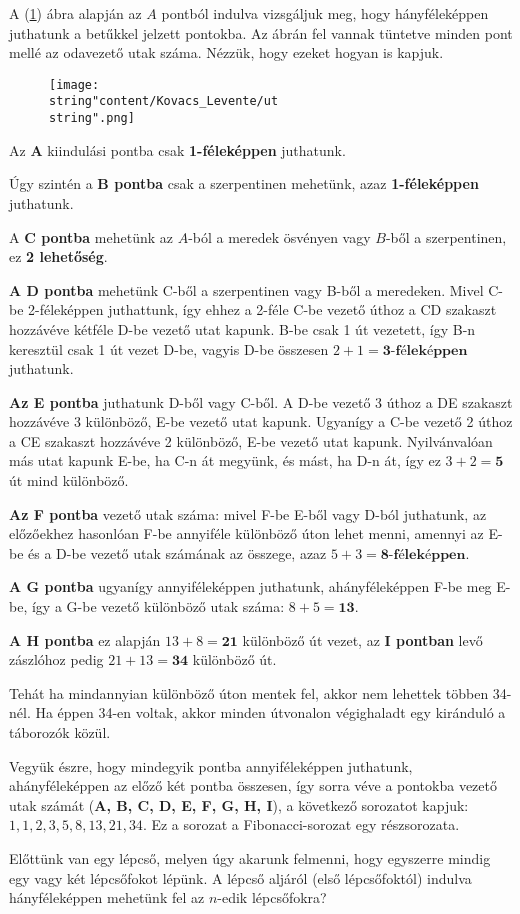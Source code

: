 \begin{solution}
A (\ref{fig3}) ábra alapján az $A$ pontból indulva vizsgáljuk meg,
hogy hányféleképpen juthatunk a betűkkel jelzett pontokba. Az ábrán
fel vannak tüntetve minden pont mellé az odavezető utak száma. Nézzük,
hogy ezeket hogyan is kapjuk.

\begin{figure}[h]
\centering \texttt{[image: \\string"content/Kovacs\_Levente/ut\\string".png]}
\caption{}
\label{fig3} 
\end{figure}

Az \textbf{A} kiindulási pontba csak \textbf{1-féleképpen} juthatunk.

Úgy szintén a \textbf{B pontba} csak a szerpentinen mehetünk, azaz
\textbf{1-féleképpen} juthatunk.

A \textbf{C pontba} mehetünk az $A$-ból a meredek ösvényen vagy $B$-ből
a szerpentinen, ez \textbf{2 lehetőség}.

\textbf{A D pontba} mehetünk C-ből a szerpentinen vagy B-ből a meredeken.
Mivel C-be 2-féleképpen juthattunk, így ehhez a 2-féle C-be vezető
úthoz a CD szakaszt hozzávéve kétféle D-be vezető utat kapunk. B-be
csak 1 út vezetett, így B-n keresztül csak 1 út vezet D-be, vagyis
D-be összesen $2+1=\textbf{3-féleképpen}$ juthatunk.

\textbf{Az E pontba} juthatunk D-ből vagy C-ből. A D-be vezető 3 úthoz
a DE szakaszt hozzávéve 3 különböző, E-be vezető utat kapunk. Ugyanígy
a C-be vezető 2 úthoz a CE szakaszt hozzávéve 2 különböző, E-be vezető
utat kapunk. Nyilvánvalóan más utat kapunk E-be, ha C-n át megyünk,
és mást, ha D-n át, így ez $3+2=\textbf{5}$ út mind különböző.

\textbf{Az F pontba} vezető utak száma: mivel F-be E-ből vagy D-ból
juthatunk, az előzőekhez hasonlóan F-be annyiféle különböző úton lehet
menni, amennyi az E-be és a D-be vezető utak számának az összege,
azaz $5+3=\textbf{8-féleképpen}$.

\textbf{A G pontba} ugyanígy annyiféleképpen juthatunk, ahányféleképpen
F-be meg E-be, így a G-be vezető különböző utak száma: $8+5=\textbf{13}$.

\textbf{A H pontba} ez alapján $13+8=\textbf{21}$ különböző út vezet,
az \textbf{I pontban} levő zászlóhoz pedig $21+13=\textbf{34}$ különböző
út.

Tehát ha mindannyian különböző úton mentek fel, akkor nem lehettek
többen 34-nél. Ha éppen 34-en voltak, akkor minden útvonalon végighaladt
egy kiránduló a táborozók közül.

Vegyük észre, hogy mindegyik pontba annyiféleképpen juthatunk, ahányféleképpen
az előző két pontba összesen, így sorra véve a pontokba vezető utak
számát (\textbf{A, B, C, D, E, F, G, H, I}), a következő sorozatot
kapjuk: $1,1,2,3,5,8,13,21,34$. Ez a sorozat a Fibonacci-sorozat
egy részsorozata. 
\end{solution}
\begin{problem}
Előttünk van egy lépcső, melyen úgy akarunk felmenni, hogy egyszerre
mindig egy vagy két lépcsőfokot lépünk. A lépcső aljáról (első lépcsőfoktól)
indulva hányféleképpen mehetünk fel az $n$-edik lépcsőfokra? 
\end{problem}

